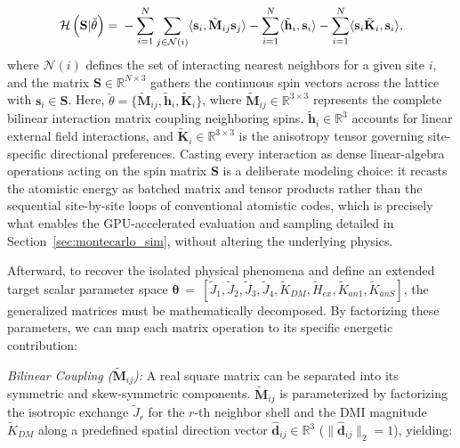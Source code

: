 \documentclass[final,5p,times,twocolumn]{elsarticle}
\begin{document}
\begin{equation}\label{eq:GeneralizedHamiltonian}
\mathcal{H}\left(\mathbf{S}| \breve{\theta}\right) ={}
- \sum_{i=1}^{N}\sum_{j\in \mathcal{N}(i)}
    \langle \mathbf{s}_i, \tilde{\mathbf{M}}_{ij}\mathbf{s}_j \rangle \\
- \sum_{i=1}^{N} \langle\tilde{\mathbf{h}}_{i},\mathbf{s}_i\rangle
- \sum_{i=1}^{N} \langle\mathbf{s}_i \tilde{\mathbf{K}}_i,
    \mathbf{s}_i\rangle,
\end{equation}
where $\mathcal{N}(i)$ defines the set of interacting nearest neighbors for a given site $i$, and the matrix $\mathbf{S}\in\mathbb{R}^{N\times 3}$ 
gathers the continuous spin vectors across the lattice with 
$\mathbf{s}_i\in\mathbf{S}$. Here, 
$\breve{\theta}=\{\tilde{\mathbf{M}}_{ij},\tilde{\mathbf{h}}_{i},
\tilde{\mathbf{K}}_{i}\}$, where 
$\tilde{\mathbf{M}}_{ij} \in \mathbb{R}^{3 \times 3}$ represents the complete bilinear interaction matrix coupling neighboring spins, $\tilde{\mathbf{h}}_i \in \mathbb{R}^{3}$ accounts for linear external field interactions, and $\tilde{\mathbf{K}}_i \in \mathbb{R}^{3 \times 3}$
is the anisotropy tensor governing site-specific directional preferences. Casting every interaction as dense linear-algebra operations acting on the spin matrix $\mathbf{S}$ is a deliberate modeling choice: it recasts the atomistic energy as batched matrix and tensor products rather than the sequential site-by-site loops of conventional atomistic codes, which is precisely what enables the GPU-accelerated evaluation and sampling detailed in Section~\ref{sec:montecarlo_sim}, without altering the underlying physics.

Afterward, to recover the isolated physical phenomena and define an extended target scalar parameter space 
$\boldsymbol{\theta}~=~[\tilde{J}_1,\tilde{J}_2,\tilde{J}_3,\tilde{J}_4,
\tilde{K}_{DM},\tilde{H}_{ex},\tilde{K}_{an1},\tilde{K}_{anS}]$, the generalized matrices must be mathematically decomposed. By factorizing these parameters, we can map each matrix operation to its specific energetic contribution:

\emph{Bilinear Coupling ($\tilde{\mathbf{M}}_{ij}$):} A 
    real square matrix can be separated into its symmetric and skew-symmetric components. $\tilde{\mathbf{M}}_{ij}$ is parameterized by factorizing the isotropic exchange $\tilde{J}_r$ for the $r$-th neighbor shell and the DMI magnitude $\tilde{K}_{DM}$ along a predefined spatial direction vector $\hat{\mathbf{d}}_{ij} \in \mathbb{R}^3$ ($\|\hat{\mathbf{d}}_{ij}\|_2=1$), yielding:
    
\end{document}
